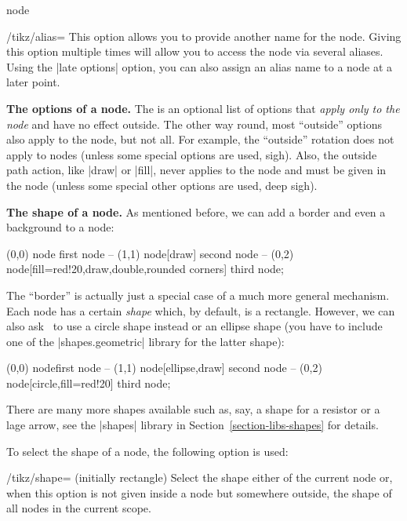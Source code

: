 \begin{pathoperation}{node}{%
    }
  \begin{key}{/tikz/alias=}
    This option allows you to provide another name for the
    node. Giving this option multiple times will allow you to access
    the node via several aliases. Using the |late options| option,
    you can also assign an alias name to a node at a later point.
  \end{key}

  \medskip
  \textbf{The options of a node.}
  The  is an optional list of options that \emph{apply
    only to the node} and have no effect outside. The other way round,
  most ``outside'' options also apply to the node, but not all. For
  example, the ``outside'' rotation does not apply to nodes (unless some
  special options are used, sigh). Also, the outside path action, like
  |draw| or |fill|, never applies to the node and must be given in the
  node (unless some special other options are used, deep sigh).

  \medskip
  \textbf{The shape of a node.}
  As mentioned before, we can add a border and even a background to a
  node:
\begin{codeexample}[]
\tikz \fill[fill=examplefill]
      (0,0) node {first node}
   -- (1,1) node[draw] {second node}
   -- (0,2) node[fill=red!20,draw,double,rounded corners] {third node};
\end{codeexample}

  The ``border'' is actually just a special case of a much more general
  mechanism. Each node has a certain \emph{shape} which, by default, is
  a rectangle. However, we can also ask \tikzname\ to use a circle shape
  instead or an ellipse shape (you have to include one of the
  |shapes.geometric| library for the latter shape):

\begin{codeexample}[]
\tikz \fill[fill=examplefill]
      (0,0) node{first node}
   -- (1,1) node[ellipse,draw] {second node}
   -- (0,2) node[circle,fill=red!20] {third node};
\end{codeexample}

  There are many more shapes available such as, say, a shape for a
  resistor or a lage arrow, see the |shapes| library in
  Section~\ref{section-libs-shapes} for details.

  To select the shape of a node, the following option is used:
  \begin{key}{/tikz/shape= (initially rectangle)}
    Select the shape either of the current node or, when this option is
    not given inside a node but somewhere outside, the shape of all
    nodes in the current scope.%


\end{key}
\end{pathoperation}

